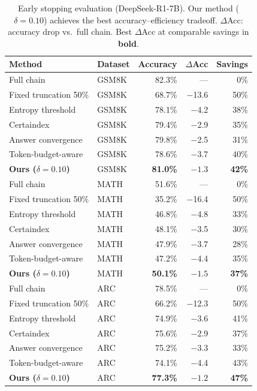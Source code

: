 \documentclass{article}
\begin{document}
\begin{table}[t]
  \caption{Early stopping evaluation (DeepSeek-R1-7B). Our method ($\delta=0.10$) achieves the best accuracy--efficiency tradeoff. $\Delta$Acc: accuracy drop vs.\ full chain. Best $\Delta$Acc at comparable savings in \textbf{bold}.}
  \label{tab:early_stopping}
  \centering
  \small
  \begin{tabular}{llrrr}
    \toprule
    Method & Dataset & Accuracy & $\Delta$Acc & Savings \\
    \midrule
    Full chain & GSM8K & 82.3\% & --- & 0\% \\
    Fixed truncation 50\% & GSM8K & 68.7\% & $-$13.6 & 50\% \\
    Entropy threshold & GSM8K & 78.1\% & $-$4.2 & 38\% \\
    Certaindex & GSM8K & 79.4\% & $-$2.9 & 35\% \\
    Answer convergence & GSM8K & 79.8\% & $-$2.5 & 31\% \\
    Token-budget-aware & GSM8K & 78.6\% & $-$3.7 & 40\% \\
    \textbf{Ours ($\delta\!=\!0.10$)} & GSM8K & \textbf{81.0\%} & $\mathbf{-1.3}$ & \textbf{42\%} \\
    \midrule
    Full chain & MATH & 51.6\% & --- & 0\% \\
    Fixed truncation 50\% & MATH & 35.2\% & $-$16.4 & 50\% \\
    Entropy threshold & MATH & 46.8\% & $-$4.8 & 33\% \\
    Certaindex & MATH & 48.1\% & $-$3.5 & 30\% \\
    Answer convergence & MATH & 47.9\% & $-$3.7 & 28\% \\
    Token-budget-aware & MATH & 47.2\% & $-$4.4 & 35\% \\
    \textbf{Ours ($\delta\!=\!0.10$)} & MATH & \textbf{50.1\%} & $\mathbf{-1.5}$ & \textbf{37\%} \\
    \midrule
    Full chain & ARC & 78.5\% & --- & 0\% \\
    Fixed truncation 50\% & ARC & 66.2\% & $-$12.3 & 50\% \\
    Entropy threshold & ARC & 74.9\% & $-$3.6 & 41\% \\
    Certaindex & ARC & 75.6\% & $-$2.9 & 37\% \\
    Answer convergence & ARC & 75.2\% & $-$3.3 & 33\% \\
    Token-budget-aware & ARC & 74.1\% & $-$4.4 & 43\% \\
    \textbf{Ours ($\delta\!=\!0.10$)} & ARC & \textbf{77.3\%} & $\mathbf{-1.2}$ & \textbf{47\%} \\

\end{tabular}
\end{table}
\end{document}
